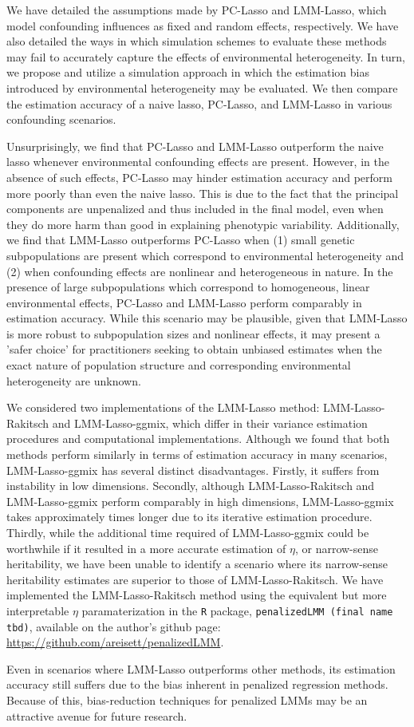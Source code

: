 We have detailed the assumptions made by PC-Lasso and LMM-Lasso, which model confounding influences as fixed and random effects, respectively. We have also detailed the ways in which simulation schemes to evaluate these methods may fail to accurately capture the effects of environmental heterogeneity. In turn, we propose and utilize a simulation approach in which the estimation bias introduced by environmental heterogeneity may be evaluated. We then compare the estimation accuracy of a naive lasso, PC-Lasso, and LMM-Lasso in various confounding scenarios.

Unsurprisingly, we find that PC-Lasso and LMM-Lasso outperform the naive lasso whenever environmental confounding effects are present. However, in the absence of such effects, PC-Lasso may hinder estimation accuracy and perform more poorly than even the naive lasso. This is due to the fact that the principal components are unpenalized and thus included in the final model, even when they do more harm than good in explaining phenotypic variability. Additionally, we find that LMM-Lasso outperforms PC-Lasso when (1) small genetic subpopulations are present which correspond to environmental heterogeneity and (2) when confounding effects are nonlinear and heterogeneous in nature. In the presence of large subpopulations which correspond to homogeneous, linear environmental effects, PC-Lasso and LMM-Lasso perform comparably in estimation accuracy. While this scenario may be plausible, given that LMM-Lasso is more robust to subpopulation sizes and nonlinear effects, it may present a 'safer choice' for practitioners seeking to obtain unbiased estimates when the exact nature of population structure and corresponding environmental heterogeneity are unknown.  

We considered two implementations of the LMM-Lasso method: LMM-Lasso-Rakitsch and LMM-Lasso-ggmix, which differ in their variance estimation procedures and computational implementations. Although we found that both methods perform similarly in terms of estimation accuracy in many scenarios, LMM-Lasso-ggmix has several distinct disadvantages. Firstly, it suffers from instability in low dimensions. Secondly, although LMM-Lasso-Rakitsch and LMM-Lasso-ggmix perform comparably in high dimensions, LMM-Lasso-ggmix takes approximately  times longer due to its iterative estimation procedure. Thirdly, while the additional time required of LMM-Lasso-ggmix could be worthwhile if it resulted in a more accurate estimation of $\eta$, or narrow-sense heritability, we have been unable to identify a scenario where its narrow-sense heritability estimates are superior to those of LMM-Lasso-Rakitsch. We have implemented the LMM-Lasso-Rakitsch method using the equivalent but more interpretable $\eta$ paramaterization in the \texttt{R} package, \texttt{penalizedLMM (final name tbd)}, available on the author's github page: \url{https://github.com/areisett/penalizedLMM}.

Even in scenarios where LMM-Lasso outperforms other methods, its estimation accuracy still suffers due to the bias inherent in penalized regression methods. Because of this, bias-reduction techniques for penalized LMMs may be an attractive avenue for future research.

